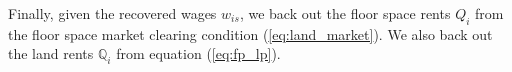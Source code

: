 \documentclass[12pt, unicode, a4paper]{article}
\newcommand{\1}{\mbox{1}\hspace{-0.25em}\mbox{l}} %
\newcommand{\aiba}[1]{{\color{red}{#1}}}
\begin{document}
Finally, given the recovered wages $w_{is}$, we back out the floor space rents $Q_i$ from the floor space market clearing condition (\ref{eq:land_market}). We also back out the land rents $\mathbb{Q}_i$ from equation (\ref{eq:fp_lp}).

\end{document}
